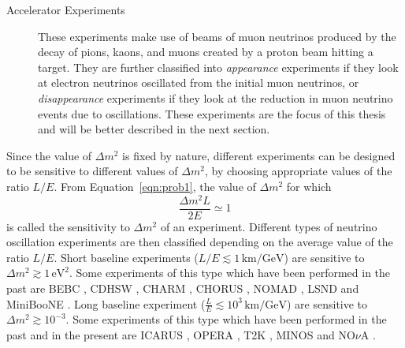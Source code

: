 \begin{description}
\item[Accelerator Experiments] These experiments make use of beams of muon neutrinos produced by the decay of pions, kaons, and muons created by a proton beam hitting a target. They are further classified into \emph{appearance} experiments if they look at electron neutrinos oscillated from the initial muon neutrinos, or \emph{disappearance} experiments if they look at the reduction in muon neutrino events due to oscillations. These experiments are the focus of this thesis and will be better described in the next section. \\
\end{description}

Since the value of $\Delta m^2$ is fixed by nature, different experiments can be designed to be sensitive to different values of $\Delta m^2$, by choosing appropriate values of the ratio $L/E$. From Equation~\eqref{eqn:prob1}, the value of $\Delta m^2$ for which
\[
\frac{\Delta m^2 L}{2E} \simeq 1
\]
is called the sensitivity to $\Delta m^2$ of an experiment.
Different types of neutrino oscillation experiments are then classified depending on the average value of the ratio $L/E$. Short baseline experiments (${L}/{E} \lesssim 1\, \text{km}/\text{GeV}$) are sensitive to $\Delta m^2 \gtrsim 1 \, \text{eV}^2$. Some experiments of this type which have been performed in the past are
BEBC \cite{BEBC}, CDHSW \cite{CDHSW}, CHARM \cite{CHARM}, CHORUS \cite{CHORUS}, NOMAD \cite{NOMAD}, LSND \cite{LSND} and MiniBooNE \cite{miniboone}. 
Long baseline experiment ($\frac{L}{E} \lesssim 10^3\, \text{km}/\text{GeV}$) are sensitive to $\Delta m^2 \gtrsim 10^{-3}$. Some experiments of this type which have been performed in the past and in the present are ICARUS \cite{ICARUS}, OPERA \cite{OPERA}, T2K \cite{t2k_systs}, MINOS \cite{MINOS} and NO$\nu$A \cite{nova}.




